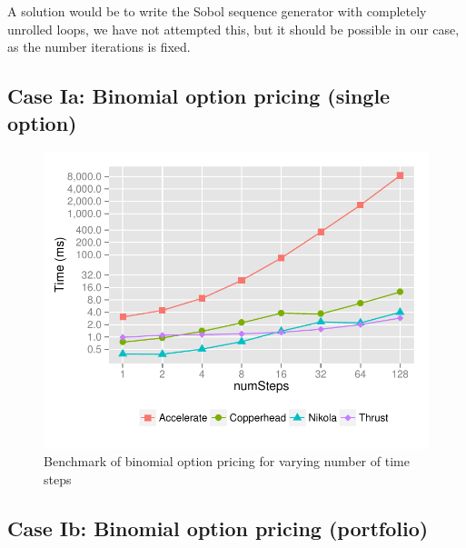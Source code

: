\documentclass[preprint]{sigplanconf}
\begin{document}
A solution would be to write the Sobol sequence generator with
completely unrolled loops, we have not attempted this, but it should
be possible in our case, as the number iterations is fixed.



\subsection{Case Ia: Binomial option pricing (single option)}
\begin{figure}
  \centering
  \includegraphics[width=\columnwidth]{figures/binomial-time-graph.pdf}
  \caption{Benchmark of binomial option pricing for varying number of
    time steps}
  \label{fig:bench_binomial}
\end{figure}

\subsection{Case Ib: Binomial option pricing (portfolio)}
\end{document}

